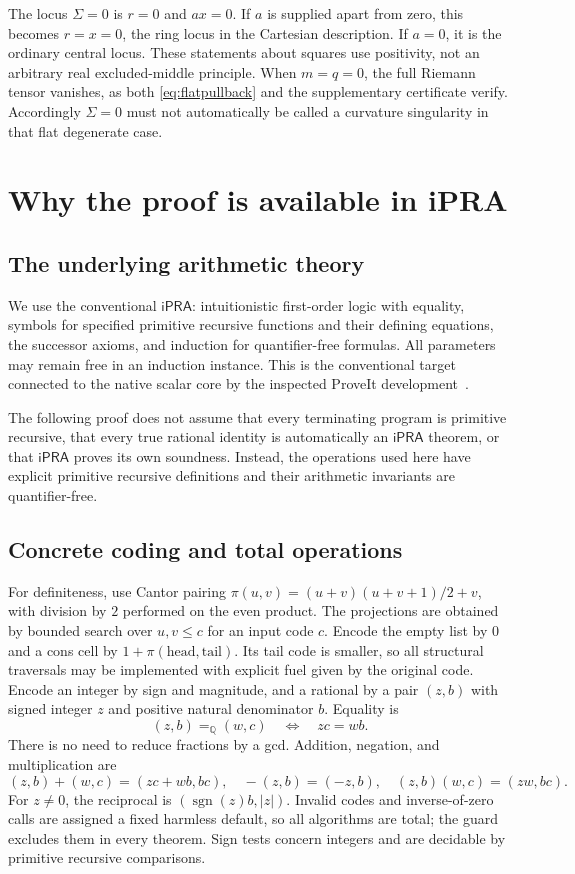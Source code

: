 \documentclass[11pt,a4paper]{article}
\numberwithin{equation}{section}
\theoremstyle{definition}\newtheorem{definition}[theorem]{Definition}
\theoremstyle{remark}\newtheorem{remark}[theorem]{Remark}
\newcommand{\ipra}{\mathsf{iPRA}}
\newcommand{\Q}{\mathbb{Q}}\newcommand{\Z}{\mathbb{Z}}\newcommand{\N}{\mathbb{N}}
\begin{document}
The locus $\Sigma=0$ is $r=0$ and $ax=0$. If $a$ is supplied apart from zero, this becomes $r=x=0$, the ring locus in the Cartesian description. If $a=0$, it is the ordinary central locus. These statements about squares use positivity, not an arbitrary real excluded-middle principle. When $m=q=0$, the full Riemann tensor vanishes, as both \eqref{eq:flatpullback} and the supplementary certificate verify. Accordingly $\Sigma=0$ must not automatically be called a curvature singularity in that flat degenerate case.

\section{Why the proof is available in iPRA}\label{sec:ipra}

\subsection{The underlying arithmetic theory}
We use the conventional $\ipra$: intuitionistic first-order logic with equality, symbols for specified primitive recursive functions and their defining equations, the successor axioms, and induction for quantifier-free formulas. All parameters may remain free in an induction instance. This is the conventional target connected to the native scalar core by the inspected ProveIt development~\cite{proveit}.

The following proof does not assume that every terminating program is primitive recursive, that every true rational identity is automatically an $\ipra$ theorem, or that $\ipra$ proves its own soundness. Instead, the operations used here have explicit primitive recursive definitions and their arithmetic invariants are quantifier-free.

\subsection{Concrete coding and total operations}
For definiteness, use Cantor pairing $\pi(u,v)=(u+v)(u+v+1)/2+v$, with division by $2$ performed on the even product. The projections are obtained by bounded search over $u,v\le c$ for an input code $c$. Encode the empty list by $0$ and a cons cell by $1+\pi(\text{head},\text{tail})$. Its tail code is smaller, so all structural traversals may be implemented with explicit fuel given by the original code. Encode an integer by sign and magnitude, and a rational by a pair $(z,b)$ with signed integer $z$ and positive natural denominator $b$. Equality is
\begin{equation}\label{eq:ratEq}
 (z,b)=_\Q(w,c)\quad\Longleftrightarrow\quad zc=wb.
\end{equation}
There is no need to reduce fractions by a gcd. Addition, negation, and multiplication are
\[
 (z,b)+(w,c)=(zc+wb,bc),\quad -(z,b)=(-z,b),\quad
 (z,b)(w,c)=(zw,bc).
\]
For $z\ne0$, the reciprocal is $(\operatorname{sgn}(z)b,|z|)$. Invalid codes and inverse-of-zero calls are assigned a fixed harmless default, so all algorithms are total; the guard excludes them in every theorem. Sign tests concern integers and are decidable by primitive recursive comparisons.
\end{document}
